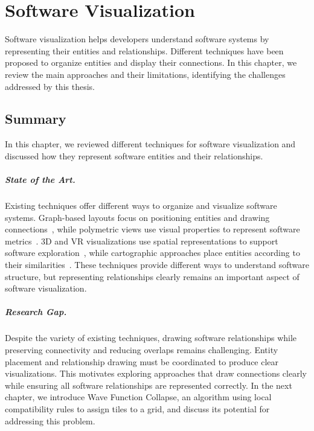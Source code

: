 \documentclass[../../main.tex]{subfiles}
\begin{document}
\chapter{Software Visualization}
Software visualization helps developers understand software systems by representing their entities and relationships. Different techniques have been proposed to organize entities and display their connections. In this chapter, we review the main approaches and their limitations, identifying the challenges addressed by this thesis.






\section{Summary}

In this chapter, we reviewed different techniques for software visualization and discussed how they represent software entities and their relationships.

\paragraph{State of the Art.}
Existing techniques offer different ways to organize and visualize software systems. Graph-based layouts focus on positioning entities and drawing connections~, while polymetric views use visual properties to represent software metrics~. 3D and VR visualizations use spatial representations to support software exploration~, while cartographic approaches place entities according to their similarities~. These techniques provide different ways to understand software structure, but representing relationships clearly remains an important aspect of software visualization.

\paragraph{Research Gap.}
Despite the variety of existing techniques, drawing software relationships while preserving connectivity and reducing overlaps remains challenging. Entity placement and relationship drawing must be coordinated to produce clear visualizations. This motivates exploring approaches that draw connections clearly while ensuring all software relationships are represented correctly. In the next chapter, we introduce Wave Function Collapse, an algorithm using local compatibility rules to assign tiles to a grid, and discuss its potential for addressing this problem.
\end{document}
